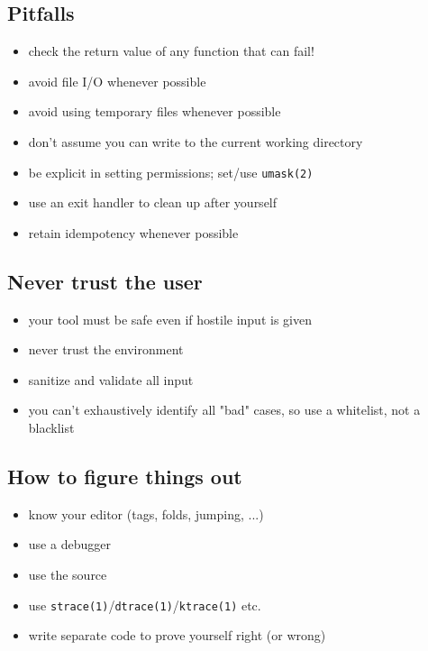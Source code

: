 \documentclass[xga]{xdvislides}
\begin{document}
\subsection{Pitfalls}
\begin{itemize}
	\item check the return value of any function that can fail!
	\item avoid file I/O whenever possible
	\item avoid using temporary files whenever possible
	\item don't assume you can write to the current working directory
	\item be explicit in setting permissions; set/use \verb+umask(2)+
	\item use an exit handler to clean up after yourself
	\item retain idempotency whenever possible
\end{itemize}

\subsection{Never trust the user}
\begin{itemize}
	\item your tool must be safe even if hostile input is given
	\item never trust the environment
	\item sanitize and validate all input
	\item you can't exhaustively identify all "bad" cases, so use a whitelist, not a blacklist
\end{itemize}

\subsection{How to figure things out}
\begin{itemize}
	\item know your editor (tags, folds, jumping, ...)
	\item use a debugger
	\item use the source
	\item use \verb+strace(1)+/\verb+dtrace(1)+/\verb+ktrace(1)+ etc.
	\item write separate code to prove yourself right (or wrong)
\end{itemize}
\end{document}

